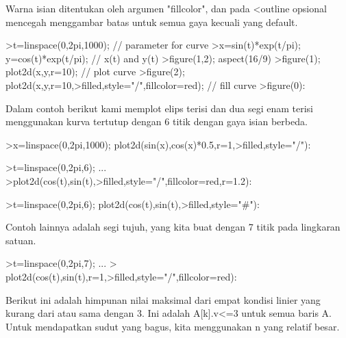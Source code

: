 \documentclass{article}
\begin{document}
\begin{eulernotebook}
\begin{eulercomment}
\begin{eulercomment}
\begin{eulercomment}
\begin{eulercomment}
\begin{eulercomment}
Warna isian ditentukan oleh argumen "fillcolor", dan pada \textless{}outline
opsional mencegah menggambar batas untuk semua gaya kecuali yang
default.
\end{eulercomment}
\begin{eulerprompt}
>t=linspace(0,2pi,1000); // parameter for curve
>x=sin(t)*exp(t/pi); y=cos(t)*exp(t/pi); // x(t) and y(t)
>figure(1,2); aspect(16/9)
>figure(1); plot2d(x,y,r=10); // plot curve
>figure(2); plot2d(x,y,r=10,>filled,style="/",fillcolor=red); // fill curve
>figure(0):
\end{eulerprompt}
\begin{eulercomment}
Dalam contoh berikut kami memplot elips terisi dan dua segi enam
terisi menggunakan kurva tertutup dengan 6 titik dengan gaya isian
berbeda.
\end{eulercomment}
\begin{eulerprompt}
>x=linspace(0,2pi,1000); plot2d(sin(x),cos(x)*0.5,r=1,>filled,style="/"):
\end{eulerprompt}
\begin{eulerprompt}
>t=linspace(0,2pi,6); ...
>plot2d(cos(t),sin(t),>filled,style="/",fillcolor=red,r=1.2):
\end{eulerprompt}
\begin{eulerprompt}
>t=linspace(0,2pi,6); plot2d(cos(t),sin(t),>filled,style="#"):
\end{eulerprompt}
\begin{eulercomment}
Contoh lainnya adalah segi tujuh, yang kita buat dengan 7 titik pada
lingkaran satuan.
\end{eulercomment}
\begin{eulerprompt}
>t=linspace(0,2pi,7);  ...
> plot2d(cos(t),sin(t),r=1,>filled,style="/",fillcolor=red):
\end{eulerprompt}
\begin{eulercomment}
Berikut ini adalah himpunan nilai maksimal dari empat kondisi linier
yang kurang dari atau sama dengan 3. Ini adalah A[k].v\textless{}=3 untuk semua
baris A. Untuk mendapatkan sudut yang bagus, kita menggunakan n yang
relatif besar.
\end{eulercomment}
\begin{eulerprompt}

\end{eulerprompt}
\end{eulercomment}
\end{eulercomment}
\end{eulercomment}
\end{eulercomment}
\end{eulernotebook}
\end{document}
